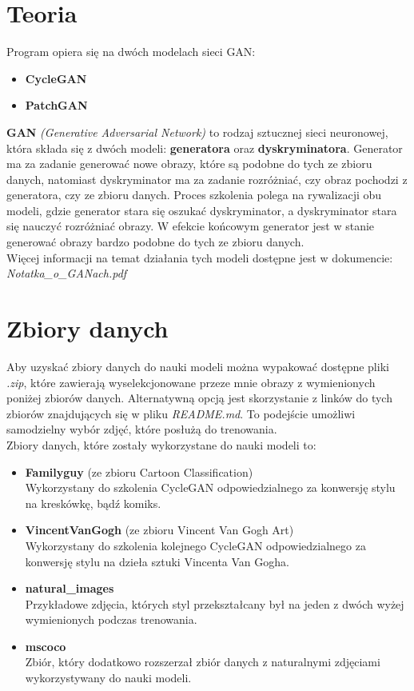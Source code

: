 \documentclass{article}
\begin{document}
\section{Teoria}
Program opiera się na dwóch modelach sieci GAN:
\begin{itemize}
    \setlength\itemsep{0pt}
    \item \textbf{CycleGAN}
    \item \textbf{PatchGAN}
\end{itemize}
\textbf{GAN} \textit{(Generative Adversarial Network)} to rodzaj sztucznej sieci neuronowej, która składa się z dwóch modeli: \textbf{generatora} oraz \textbf{dyskryminatora}.
Generator ma za zadanie generować nowe obrazy, które są podobne do tych ze zbioru danych, natomiast dyskryminator ma za zadanie rozróżniać, czy obraz pochodzi z generatora, czy ze zbioru danych.
Proces szkolenia polega na rywalizacji obu modeli, gdzie generator stara się oszukać dyskryminator, a dyskryminator stara się nauczyć rozróżniać obrazy.
W efekcie końcowym generator jest w stanie generować obrazy bardzo podobne do tych ze zbioru danych.
\vspace{3mm} \\
Więcej informacji na temat działania tych modeli dostępne jest w dokumencie: \textit{Notatka\_o\_GANach.pdf}

\section{Zbiory danych}
Aby uzyskać zbiory danych do nauki modeli można wypakować dostępne pliki \textit{.zip}, które zawierają wyselekcjonowane przeze mnie obrazy z wymienionych poniżej zbiorów danych. Alternatywną opcją jest skorzystanie z linków do tych zbiorów znajdujących się w pliku \textit{README.md}. To podejście umożliwi samodzielny wybór zdjęć, które posłużą do trenowania.
\vspace{3mm} \\
Zbiory danych, które zostały wykorzystane do nauki modeli to:
\begin{itemize}
    \item \textbf{Familyguy} (ze zbioru Cartoon Classification) \\
Wykorzystany do szkolenia CycleGAN odpowiedzialnego za konwersję stylu na kreskówkę, bądź komiks.
    \item \textbf{VincentVanGogh} (ze zbioru Vincent Van Gogh Art) \\
Wykorzystany do szkolenia kolejnego CycleGAN odpowiedzialnego za konwersję stylu na dzieła sztuki Vincenta Van Gogha.
    \item \textbf{natural\_images} \\
Przykładowe zdjęcia, których styl przekształcany był na jeden z dwóch wyżej wymienionych podczas trenowania.
    \item \textbf{mscoco} \\
Zbiór, który dodatkowo rozszerzał zbiór danych z naturalnymi zdjęciami wykorzystywany do nauki modeli.
\end{itemize}
\end{document}
